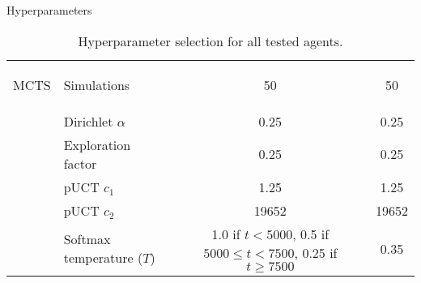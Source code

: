 \begin{frame}[allowframebreaks]{Hyperparameters}
\begin{table}
{\begin{tabular}{|c|l||c|c|}
                \hline

                \multirow{7.5}{*}{\begin{sideways}MCTS\end{sideways}} & Simulations & 50 & 50 \\
                \cline{2-4}
                & Dirichlet $\alpha$ & 0.25 & 0.25 \\
                \cline{2-4}
                & Exploration factor & 0.25 & 0.25 \\
                \cline{2-4}
                & pUCT $c_1$ & 1.25 & 1.25 \\
                \cline{2-4}
                & pUCT $c_2$ & 19652 & 19652 \\
                \cline{2-4}
                & Softmax temperature ($T$) & \makecell{
                    1.0 if $t<5000$, \\ 0.5 if $5000 \leq t < 7500$, \\ 0.25 if $t \geq 7500$
                } & 0.35 \\

                \hline
            \end{tabular}
        }
        \caption{Hyperparameter selection for all tested agents.}
    \end{table}
\end{frame}

